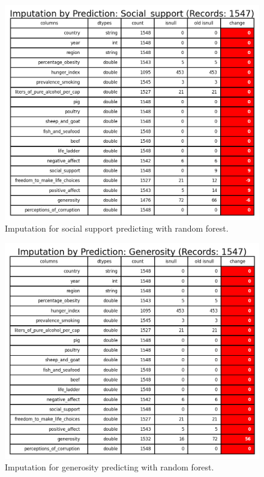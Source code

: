                 \begin{figure}[H]
                        \centering
                        \includegraphics[scale=1]{images/dp_imput_social_support}
                        \caption{Imputation for social support predicting with random forest.}
                        \label{fig:dp-imput-social-support}
                \end{figure}
                \begin{figure}[H]
                        \centering
                        \includegraphics[scale=1]{images/dp_imput_generosity}
                        \caption{Imputation for generosity predicting with random forest.}
                        \label{fig:dp-imput-generosity}
                \end{figure}
